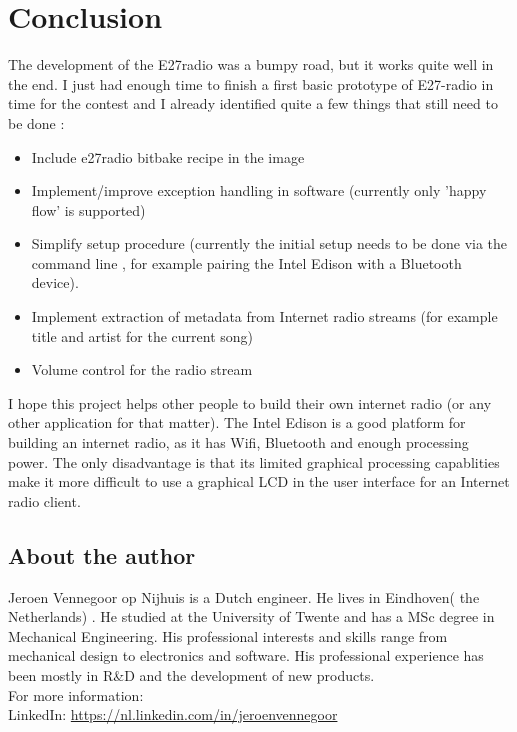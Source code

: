 \documentclass[12pt,a4paper]{scrreprt}
\begin{document}
\chapter{Conclusion}
The development of the E27radio was a bumpy road, but it works quite well in the end. I just had enough time to finish a first basic prototype of E27-radio in time for the contest and I already identified quite a few things that still need to be done :
\begin{itemize}
	\item Include e27radio bitbake recipe in the image
	\item Implement/improve exception handling in software 
	(currently only 'happy flow' is supported)
	\item Simplify setup procedure (currently the initial setup needs to be done via the command line , for example pairing the Intel Edison with a Bluetooth device).
	\item Implement extraction of metadata from Internet radio streams (for example title and artist for the current song)
	\item Volume control for the radio stream
\end{itemize}
I hope this project helps other people to build their own internet radio (or any other application for that matter). The Intel Edison is a good platform for building an internet radio, as it has Wifi, Bluetooth and enough processing power. The only disadvantage is that its limited graphical processing capablities make it more difficult to use a graphical LCD in the user interface for an Internet radio client.

\begin{appendices}

\chapter{About the author}
Jeroen Vennegoor op Nijhuis is a Dutch engineer. 
He lives in Eindhoven( the Netherlands) . He studied at the University of Twente and has a MSc degree in Mechanical Engineering. His professional interests and skills  range from mechanical design to electronics and software. His professional experience has been mostly in R\&D and the development of new products.\\
For more information:\\
LinkedIn: \url{https://nl.linkedin.com/in/jeroenvennegoor}

\end{appendices}
\end{document}
